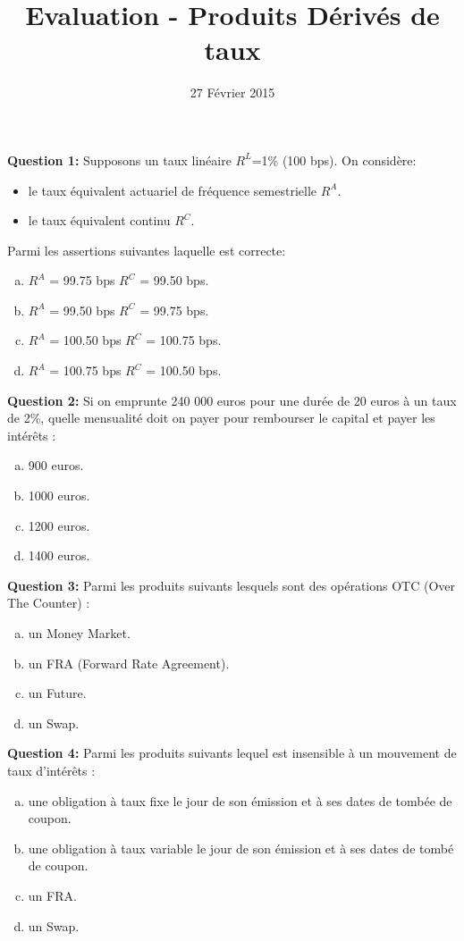 \documentclass{article}
\newcommand{\indentitem}{\setlength\itemindent{25pt}}
\begin{document}
\title{Evaluation - Produits Dérivés de taux}
\date{27 Février 2015}
\maketitle

\textbf{Question 1:} Supposons un taux linéaire $R^L$=1\% (100 bps). On considère: 
\begin{itemize}
	\indentitem \item le taux équivalent actuariel de fréquence semestrielle $R^A$.
	\indentitem \item le taux équivalent continu $R^C$.
\end{itemize}
\vspace{0.2cm}
Parmi les assertions suivantes laquelle est correcte:
\begin{enumerate}[a)]
\indentitem \item $R^A$ = 99.75 bps $R^C$ = 99.50 bps.
\indentitem \item $R^A$ = 99.50 bps $R^C$ = 99.75 bps.
\indentitem \item $R^A$ = 100.50 bps $R^C$ = 100.75 bps.
\indentitem \item $R^A$ = 100.75 bps $R^C$ = 100.50 bps.
\end{enumerate}

\textbf{Question 2:}
Si on emprunte 240 000 euros pour une durée de 20 euros à un taux de 2\%, quelle mensualité doit on payer pour rembourser le capital et payer les intérêts :
\begin{enumerate}[a)]
\indentitem \item 900 euros.
\indentitem \item 1000 euros.
\indentitem \item 1200 euros.
\indentitem \item 1400 euros.
\end{enumerate}

\textbf{Question 3:}
Parmi les produits suivants lesquels sont des opérations OTC (Over The Counter) :
\begin{enumerate}[a)]
\indentitem \item un Money Market.
\indentitem \item un FRA (Forward Rate Agreement).
\indentitem \item un Future.
\indentitem \item un Swap.
\end{enumerate}

\textbf{Question 4:}
Parmi les produits suivants lequel est insensible à un mouvement de taux d’intérêts :
\begin{enumerate}[a)]
\indentitem \item une obligation à taux fixe le jour de son émission et à ses dates de tombée de coupon.
\indentitem \item une obligation à taux variable le jour de son émission et à ses dates de tombé de coupon.
\indentitem \item un FRA.
\indentitem \item un Swap.
\end{enumerate}
\end{document}
